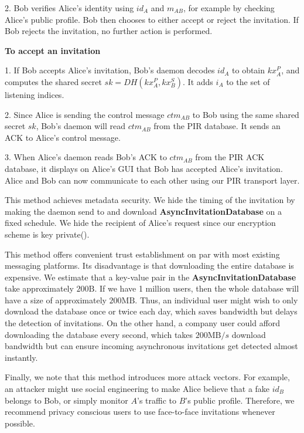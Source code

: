 2. Bob verifies Alice's identity using $id_A$ and $m_{AB}$, for example by checking Alice's public profile. Bob then chooses to either accept or reject the invitation. If Bob rejects the invitation, no further action is performed. 

\textbf{To accept an invitation}

1. If Bob accepts Alice's invitation, Bob's daemon decodes $id_A$ to obtain $kx_A^P$, and computes the shared secret $sk = DH(kx_A^P, kx_B^S)$. It adds $i_A$ to the set of listening indices.

2. Since Alice is sending the control message $ctm_{AB}$ to Bob using the same shared secret $sk$, Bob's daemon will read $ctm_{AB}$ from the PIR database. It sends an ACK to Alice's control message.

3. When Alice's daemon reads Bob's ACK to $ctm_{AB}$ from the PIR ACK database, it displays on Alice's GUI that Bob has accepted Alice's invitation. Alice and Bob can now communicate to each other using our PIR transport layer.

This method achieves metadata security. We hide the timing of the invitation by making the daemon send to and download \textbf{AsyncInvitationDatabase} on a fixed schedule. We hide the recipient of Alice's request since our encryption scheme is key private(). 

This method offers convenient trust establishment on par with most existing messaging platforms. Its disadvantage is that downloading the entire database is expensive. We estimate that a key-value pair in the \textbf{AsyncInvitationDatabase} take approximately $200\text{B}$. If we have 1 million users, then the whole database will have a size of approximately $200\text{MB}$. Thus, an individual user might wish to only download the database once or twice each day, which saves bandwidth but delays the detection of invitations. On the other hand, a company user could afford downloading the database every second, which takes $200\text{MB}/s$ download bandwidth but can ensure incoming asynchronous invitations get detected almost instantly.

Finally, we note that this method introduces more attack vectors. For example, an attacker might use social engineering to make Alice believe that a fake $id_B$ belongs to Bob, or simply monitor $A$'s traffic to $B$'s public profile. Therefore, we recommend privacy conscious users to use face-to-face invitations whenever possible.